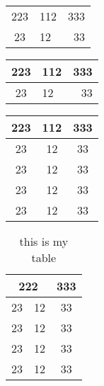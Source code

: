 \documentclass{book} %
\begin{document}
\begin{tabular}{clr}
223&112&333\\
23&12&33\\
\end{tabular}

\begin{tabular}{|c|l|r|}
\hline
223&112&333\\
\hline
23&12&33\\
\hline
\end{tabular}



\begin{tabular}{ccc}
\hline
223&112&333\\
\hline
23&12&33\\
23&12&33\\
23&12&33\\
23&12&33\\
\hline
\end{tabular}

\begin{table}
	\centering

	\caption{this is my table}
\begin{tabular}{ccc}
\hline
\multicolumn{2}{c}{222}&333\\
\hline
23&12&33\\
\cline{2-3}
23&12&33\\
23&12&33\\
23&12&33\\
\hline
\end{tabular}
\end{table}
\end{document}
